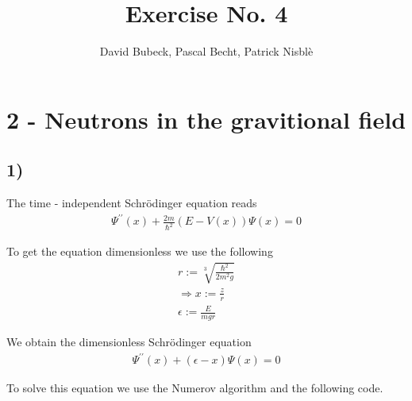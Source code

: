 \documentclass[11pt, a4paper, reqno]{scrartcl}
\begin{document}
    \title{Exercise No. 4}
    \author{David Bubeck, Pascal Becht, Patrick Nisbl\`e}
    \maketitle
    

    \newpage
    \section*{2 - Neutrons in the gravitional field}

    	\subsection*{1)}
			The time - independent Schrödinger equation reads
			\begin{align}
        		\Psi^{\prime \prime}(x) + \frac{2m}{\hbar^2}(E - V(x)) \Psi(x) = 0
    		\end{align}
    		
    		To get the equation dimensionless we use the following
    		\begin{align}
    			r := \sqrt[3]{\frac{\hbar^2}{2m^2g}} \\
    			\Rightarrow x := \frac{z}{r} \\
    			\epsilon := \frac{E}{mgr}
    		\end{align}
    		
    		We obtain the dimensionless Schrödinger equation
    		\begin{align}
        		\Psi^{\prime \prime}(x) + (\epsilon - x) \Psi(x) = 0
    		\end{align}
    		
			To solve this equation we use the Numerov algorithm and the following 				code.    		
    		
    		\begin{figure}[H]
        		        
    		\end{figure}
    		
\end{document}
